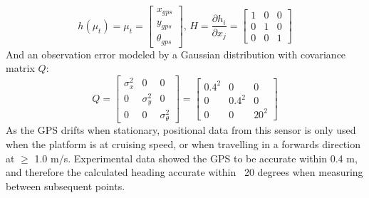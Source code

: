 \documentclass[main.tex]{subfiles}
\begin{document}
\[
h(\mu_t) = \mu_t = 
\begin{bmatrix}
    x_{gps}\\
    y_{gps}\\
    \theta_{gps}
\end{bmatrix}
\textrm{, } H = \frac{\partial h_i}{\partial x_j} = 
\begin{bmatrix}
    1	&	0	&	0\\
    0	&	1	&	0\\
    0	&	0	&	1
\end{bmatrix}
\]
And an observation error modeled by a Gaussian distribution with covariance matrix $Q$:
\[
Q = 
\begin{bmatrix}
    \sigma_x^2	&	0	&	0\\
    0	&	\sigma_y^2	&	0\\
    0	&	0	&	\sigma_\theta^2
\end{bmatrix}
=
\begin{bmatrix}
    0.4^2	&	0	&	0\\
    0	&	0.4^2	&	0\\
    0	&	0	&	20^2
\end{bmatrix}
\]
As the GPS drifts when stationary, positional data from this sensor is only used when the platform is at cruising speed, or when travelling in a forwards direction at $\geqslant$ 1.0 m/s. Experimental data showed the GPS to be accurate within 0.4 m, and therefore the calculated heading accurate within ~20 degrees when measuring between subsequent points. 
\end{document}
